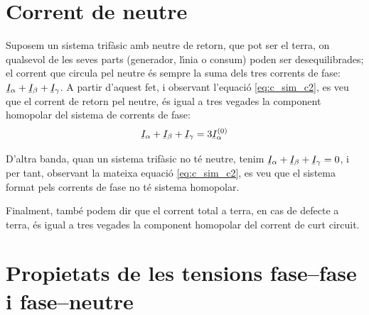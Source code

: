\section{Corrent de neutre} 

Suposem un sistema trif\`{a}sic amb neutre de retorn, que pot ser el
terra, on qualsevol de les seves parts (generador, l\'{\i}nia o consum)
poden ser desequilibrades; el corrent que circula pel neutre \'{e}s
sempre la suma dels tres corrents de fase: $\cmplx{I}_\alpha+
\cmplx{I}_\beta+\cmplx{I}_\gamma$. A partir d'aquest fet, i
observant l'equaci\'{o} \eqref{eq:c_sim_c2}, es veu que el corrent de
retorn pel neutre, \'{e}s igual a tres vegades la component homopolar
del sistema de corrents de fase:
\begin{equation}
    \cmplx{I}_\alpha+\cmplx{I}_\beta+\cmplx{I}_\gamma =3 \cmplx{I}_\alpha\ap{(0)}
\end{equation}

D'altra banda, quan un sistema trif\`{a}sic no t\'{e} neutre, tenim
$\cmplx{I}_\alpha+ \cmplx{I}_\beta+\cmplx{I}_\gamma=0$, i per tant,
observant la mateixa equaci\'{o} \eqref{eq:c_sim_c2}, es veu que el
sistema format pels corrents de fase no t\'{e} sistema homopolar.

Finalment, tamb\'{e} podem dir que el corrent total a terra, en cas de
defecte a terra, \'{e}s igual a tres vegades la component homopolar del
corrent de curt circuit.

\section{Propietats de les tensions fase--fase i fase--neutre}\label{sec:comp-sim-neutre}
 

